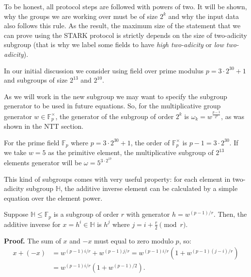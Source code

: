 \documentclass[../lecture-notes-148x210.tex]{subfiles}
\begin{document}
To be honest, all protocol steps are followed with powers of two. It will be shown, why the groups we are working over must be of size $2^k$ and why the input data also follows this rule. As the result, the maximum size of the statement that we can prove using the STARK protocol is strictly depends on the size of two-adicity subgroup (that is why we label some fields to have \textit{high two-adicity} or \textit{low two-adicity}).

\begin{remark}
In our initial discussion we consider using field over prime modulus $p = 3\cdot
2^{30} + 1$ and subgroups of size $2^{13}$ and $2^{10}$.
\end{remark}

As we will work in the new subgroup we may want to specify the subgroup
generator to be used in future equations. So, for the multiplicative group
generator $w \in \mathbb{F}_p^{\times}$, the generator of the subgroup of order
$2^k$ is $\omega_k = w^\frac{p - 1}{2^k}$, as was shown in the NTT section.

\begin{example}
For the prime field $\mathbb{F}_p$ where $p = 3\cdot 2^{30} + 1$, the order of $\mathbb{F}^{\times}_p$ is $p-1 = 3\cdot 2^{30}$. If we take $w = 5$ as the primitive element, the multiplicative subgroup of $2^{13}$ elements generator will be $\omega = 5^{3\cdot 2^{17}}$
\end{example}

This kind of subgroups comes with very useful property: for each element in
two-adicity subgroup $\mathbb{H}$, the additive inverse element
can be calculated by a simple equation over the element power.

\begin{proposition}
    Suppose $\mathbb{H} \leq \mathbb{F}_p$ is a subgroup of order $r$ with
    generator $h = w^{(p-1)/r}$. Then, the additive inverse for $x = h^i \in
    \mathbb{H}$ is $h^j$ where $j = i + \frac{r}{2} \pmod{r}$.
\end{proposition}

\textbf{Proof.} The sum of $x$ and $-x$ must equal to zero modulo $p$, so:
\begin{equation*}
    \begin{aligned}
        x + (-x) &= w^{(p-1)i/r} + w^{(p-1)j/r} = w^{(p-1)i/r}(1 + w^{(p-1)(j-i)/r}) \\ &= w^{(p-1)i/r}(1 + w^{(p-1)/2}).
    \end{aligned}
\end{equation*}
\end{document}

